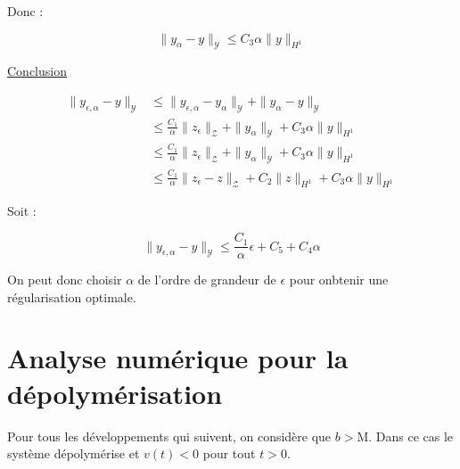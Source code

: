 \documentclass[a4paper]{article}
\newcommand{\mass}{\mathrm{M}}
\newcommand{\dep}{b}
\newcommand{\Y}{\mathscr{Y}}
\newcommand{\Z}{\mathscr{Z}}
\newcommand{\yea}{y_{\epsilon, \alpha}}
\begin{document}
\begin{preuve}
Donc :

\[ \| y_\alpha - y \|_{\Y} \leq  C_3 \alpha \| y \|_{H^1} \]

\vspace{0.3cm}
\underline{Conclusion}

\[
\begin{split}
	\| \yea - y \|_{\Y} & \leq \| \yea - y_\alpha \|_{\Y} + \| y_\alpha - y \|_{\Y}\\ 	                                             & \leq \frac{C_1}{\alpha}  \| z_\epsilon \|_{\Z} 
	                          + \| y_\alpha \|_{\Y} + C_3\alpha \| y \|_{H^1}\\
	                    & \leq \frac{C_1}{\alpha} \| z_\epsilon \|_{\Z} 
						       + \| y_\alpha \|_{\Y} 
						      + C_3\alpha  \| y \|_{H^1}\\
	  	              & \leq \frac{C_1}{\alpha} \| z_\epsilon - z \|_{\Z} 
					         + C_2 \| z \|_{H^1} 
	  						 + C_3\alpha  \| y \|_{H^1}
\end{split}
\]

Soit :

\[ \displaystyle
\| \yea - y \|_{\Y} \leq \frac{C_1}{\alpha} \epsilon + C_5 +C_4 \alpha \]



\end{preuve}


On peut donc choisir $\alpha$ de l'ordre de grandeur de $\epsilon$
pour onbtenir une régularisation optimale.



\section{Analyse numérique pour la dépolymérisation}

Pour tous les développements qui suivent, on considère que $\dep>\mass$. Dans ce cas le système dépolymérise et $v(t)<0$ pour tout $t>0$.
\end{document}
